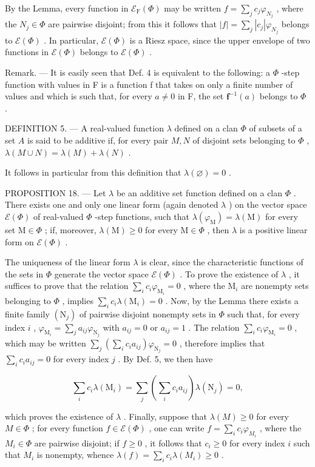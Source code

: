 By the Lemma, every function in \(\mathcal{E}_{\mathrm{F}}(\Phi)\) may be written \(f = \sum_{j} c_{j} \varphi_{N_{j}}\) , where the \(N_{j} \in \Phi\) are pairwise disjoint; from this it follows that \(|f| = \sum_{j} |c_{j}| \varphi_{N_{j}}\) belongs to \(\mathcal{E}(\Phi)\) . In particular, \(\mathcal{E}(\Phi)\) is a Riesz space, since the upper envelope of two functions in \(\mathcal{E}(\Phi)\) belongs to \(\mathcal{E}(\Phi)\) .

Remark. --- It is easily seen that Def. 4 is equivalent to the following: a \(\Phi\) -step function with values in F is a function f that takes on only a finite number of values and which is such that, for every \(a \neq 0\) in F, the set \(\mathbf{f}^{-1}(a)\) belongs to \(\Phi\) .

DEFINITION 5. --- A real-valued function \(\lambda\) defined on a clan \(\Phi\) of subsets of a set \(A\) is said to be additive if, for every pair \(M, N\) of disjoint sets belonging to \(\Phi\) , \(\lambda(M \cup N) = \lambda(M) + \lambda(N)\) .

It follows in particular from this definition that \(\lambda(\varnothing)=0\) .

PROPOSITION 18. --- Let \(\lambda\) be an additive set function defined on a clan \(\Phi\) . There exists one and only one linear form (again denoted \(\lambda\) ) on the vector space \(\mathcal{E}(\Phi)\) of real-valued \(\Phi\) -step functions, such that \(\lambda(\varphi_{\mathrm{M}}) = \lambda(\mathrm{M})\) for every set \(\mathrm{M} \in \Phi\) ; if, moreover, \(\lambda(\mathrm{M}) \geqslant 0\) for every \(\mathrm{M} \in \Phi\) , then \(\lambda\) is a positive linear form on \(\mathcal{E}(\Phi)\) .

The uniqueness of the linear form \(\lambda\) is clear, since the characteristic functions of the sets in \(\Phi\) generate the vector space \(\mathcal{E}(\Phi)\) . To prove the existence of \(\lambda\) , it suffices to prove that the relation \(\sum_{i} c_i \varphi_{\mathrm{M}_i} = 0\) , where the \(\mathrm{M}_i\) are nonempty sets belonging to \(\Phi\) , implies \(\sum_{i} c_i \lambda(\mathrm{M}_i) = 0\) . Now, by the Lemma there exists a finite family \((\mathrm{N}_j)\) of pairwise disjoint nonempty sets in \(\Phi\) such that, for every index \(i\) , \(\varphi_{\mathrm{M}_i} = \sum_{j} a_{ij} \varphi_{\mathrm{N}_j}\) with \(a_{ij} = 0\) or \(a_{ij} = 1\) . The relation \(\sum_{i} c_i \varphi_{\mathrm{M}_i} = 0\) , which may be written \(\sum_{j} \left( \sum_{i} c_i a_{ij} \right) \varphi_{\mathrm{N}_j} = 0\) , therefore implies that \(\sum_{i} c_i a_{ij} = 0\) for every index \(j\) . By Def. 5, we then have

\[
\sum_ {i} c _ {i} \lambda (\mathrm{M} _ {i}) = \sum_ {j} \left(\sum_ {i} c _ {i} a _ {i j}\right) \lambda (\mathrm{N} _ {j}) = 0,
\]

which proves the existence of \(\lambda\) . Finally, suppose that \(\lambda(M) \geqslant 0\) for every \(M \in \Phi\) ; for every function \(f \in \mathcal{E}(\Phi)\) , one can write \(f = \sum_{i} c_i \varphi_{M_i}\) , where the \(M_i \in \Phi\) are pairwise disjoint; if \(f \geqslant 0\) , it follows that \(c_i \geqslant 0\) for every index \(i\) such that \(M_i\) is nonempty, whence \(\lambda(f) = \sum_{i} c_i \lambda(M_i) \geqslant 0\) .

